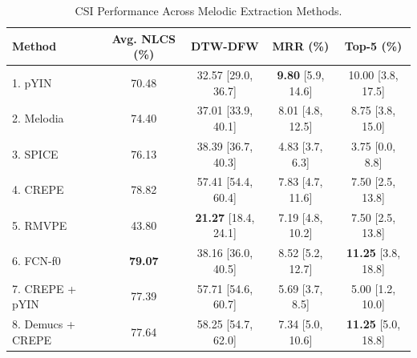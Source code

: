 \begin{table}[h!]
\centering
\caption{CSI Performance Across Melodic Extraction Methods.}
\label{tab:ciarp2_table2}
\begin{tabular}{|l|c|c|c|c|}
\hline
\textbf{Method} & \textbf{Avg. NLCS (\%)} & \textbf{DTW-DFW} & \textbf{MRR (\%)} & \textbf{Top-5 (\%)} \\
\hline
1. pYIN & 70.48 & 32.57 [29.0, 36.7] & \textbf{9.80} [5.9, 14.6] & 10.00 [3.8, 17.5] \\
2. Melodia & 74.40 & 37.01 [33.9, 40.1] & 8.01 [4.8, 12.5] & 8.75 [3.8, 15.0] \\
3. SPICE & 76.13 & 38.39 [36.7, 40.3] & 4.83 [3.7, 6.3] & 3.75 [0.0, 8.8] \\
4. CREPE & 78.82 & 57.41 [54.4, 60.4] & 7.83 [4.7, 11.6] & 7.50 [2.5, 13.8] \\
5. RMVPE & 43.80 & \textbf{21.27} [18.4, 24.1] & 7.19 [4.8, 10.2] & 7.50 [2.5, 13.8] \\
6. FCN-f0 & \textbf{79.07} & 38.16 [36.0, 40.5] & 8.52 [5.2, 12.7] & \textbf{11.25} [3.8, 18.8] \\
7. CREPE + pYIN & 77.39 & 57.71 [54.6, 60.7] & 5.69 [3.7, 8.5] & 5.00 [1.2, 10.0] \\
8. Demucs + CREPE & 77.64 & 58.25 [54.7, 62.0] & 7.34 [5.0, 10.6] & \textbf{11.25} [5.0, 18.8] \\
\hline
\end{tabular}
\end{table}
